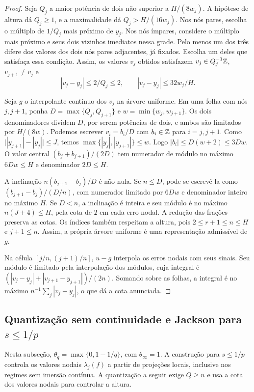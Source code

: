\documentclass[12pt,a4paper]{article}
\begin{document}
\begin{proof}
Seja $Q_j$ a maior potência de dois não superior a $H/(8w_j)$. A hipótese de altura dá $Q_j\ge1$, e a maximalidade dá $Q_j>H/(16w_j)$. Nos nós pares, escolha o múltiplo de $1/Q_j$ mais próximo de $y_j$. Nos nós ímpares, considere o múltiplo mais próximo e seus dois vizinhos imediatos nessa grade. Pelo menos um dos três difere dos valores dos dois nós pares adjacentes, já fixados. Escolha um deles que satisfaça essa condição. Assim, os valores $v_j$ obtidos satisfazem $v_j\in Q_j^{-1}\mathbb Z$, $v_{j+1}\ne v_j$ e
\[
 |v_j-y_j|\le 2/Q_j\le2,\qquad |v_j-y_j|\le32w_j/H.
\]

Seja $g$ o interpolante contínuo dos $v_j$ na árvore uniforme. Em uma folha com nós $j,j+1$, ponha $D=\max\{Q_j,Q_{j+1}\}$ e $w=\min\{w_j,w_{j+1}\}$. Os dois denominadores dividem $D$, por serem potências de dois, e ambos são limitados por $H/(8w)$. Podemos escrever $v_i=b_i/D$ com $b_i\in\mathbb Z$ para $i=j,j+1$. Como $\bigl||y_{j+1}|-|y_j|\bigr|\le J$, temos $\max\{|y_j|,|y_{j+1}|\}\le w$. Logo $|b_i|\le D(w+2)\le3Dw$. O valor central $(b_j+b_{j+1})/(2D)$ tem numerador de módulo no máximo $6Dw\le H$ e denominador $2D\le H$.

A inclinação $n(b_{j+1}-b_j)/D$ é não nula. Se $n\le D$, pode-se escrevê-la como $(b_{j+1}-b_j)/(D/n)$, com numerador limitado por $6Dw$ e denominador inteiro no máximo $H$. Se $D<n$, a inclinação é inteira e seu módulo é no máximo $n(J+4)\le H$, pela cota de $2$ em cada erro nodal. A redução das frações preserva as cotas. Os índices também respeitam a altura, pois $2\le r+1\le n\le H$ e $j+1\le n$. Assim, a própria árvore uniforme é uma representação admissível de $g$.

Na célula $[j/n,(j+1)/n]$, $u-g$ interpola os erros nodais com seus sinais. Seu módulo é limitado pela interpolação dos módulos, cuja integral é $(|v_j-y_j|+|v_{j+1}-y_{j+1}|)/(2n)$. Somando sobre as folhas, a integral é no máximo $n^{-1}\sum_j|v_j-y_j|$, o que dá a cota anunciada.
\end{proof}

\subsection{Quantização sem continuidade e Jackson para \texorpdfstring{$s\le1/p$}{s ≤ 1/p}}

Nesta subseção, $\theta_q=\max\{0,1-1/q\}$, com $\theta_\infty=1$. A construção para $s\le1/p$ controla os valores nodais $\lambda_j(f)$ a partir de projeções locais, inclusive nos regimes sem imersão contínua. A quantização a seguir exige $Q\ge n$ e usa a cota dos valores nodais para controlar a altura.
\end{document}
